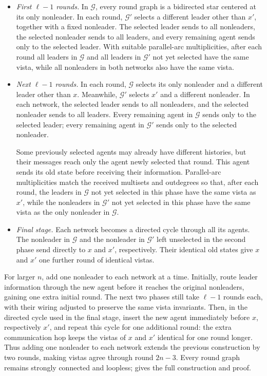 \documentclass[11pt]{article}
\begin{document}
\begin{itemize}
\item \emph{First \(\ell-1\) rounds.}
In \(\mathcal G\), every round graph is a bidirected star
centered at its only nonleader.
In each round, \(\mathcal G'\) selects a different leader
other than \(x'\), together with a fixed nonleader.
The selected leader sends to all nonleaders, the selected nonleader
sends to all leaders, and every remaining agent sends only to
the selected leader.
With suitable parallel-arc multiplicities, after each round
all leaders in \(\mathcal G\) and all leaders in \(\mathcal G'\)
not yet selected have the same vista, while all nonleaders
in both networks also have the same vista.

\item \emph{Next \(\ell-1\) rounds.}
In each round, \(\mathcal G\) selects its only nonleader
and a different leader other than \(x\).
Meanwhile, \(\mathcal G'\) selects \(x'\) and a different nonleader.
In each network, the selected leader sends to all nonleaders,
and the selected nonleader sends to all leaders.
Every remaining agent in \(\mathcal G\) sends only to the
selected leader; every remaining agent in \(\mathcal G'\)
sends only to the selected nonleader.

Some previously selected agents may already have different histories,
but their messages reach only the agent newly selected that round.
This agent sends its old state before receiving their information.
Parallel-arc multiplicities match the received multisets and outdegrees
so that, after each round, the leaders in \(\mathcal G\) not yet
selected in this phase have the same vista as \(x'\), while the nonleaders
in \(\mathcal G'\) not yet selected in this phase have the same vista as the only nonleader in \(\mathcal G\).

\item \emph{Final stage.}
Each network becomes a directed cycle through all its agents.
The nonleader in \(\mathcal G\) and the nonleader in \(\mathcal G'\)
left unselected in the second phase send directly to \(x\) and \(x'\),
respectively.
Their identical old states give \(x\) and \(x'\) one further
round of identical vistas.
\end{itemize}
For larger \(n\), add one nonleader to each network at a time.
Initially, route leader information through the new agent before
it reaches the original nonleaders, gaining one extra initial round.
The next two phases still take \(\ell-1\) rounds each,
with their wiring adjusted to preserve the same vista invariants.
Then, in the directed cycle used in the final stage, insert the new agent immediately before \(x\), respectively \(x'\), and repeat this cycle for one additional round:
the extra communication hop keeps the vistas of \(x\) and \(x'\)
identical for one round longer.
Thus adding one nonleader to each network extends the previous construction by two rounds, making vistas agree through round \(2n-3\). Every round graph remains strongly connected and loopless;
 gives the full construction and proof.
\end{document}
